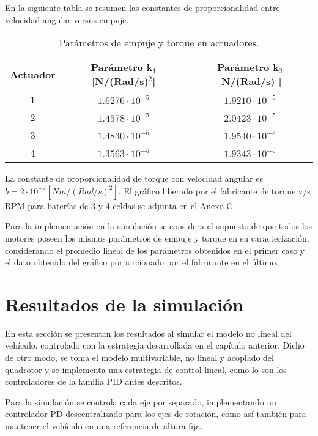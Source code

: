 \documentclass[../main.tex]{subfiles}
\begin{document}
\textcompwordmark{}

En la siguiente tabla se resumen las constantes de proporcionalidad
entre velocidad angular versus empuje. 

\begin{table}[H]
\noindent \begin{centering}
\begin{tabular}{|c|c|c|}
\hline 
Actuador & Parámetro k$_1$ {[}N/(Rad/s)$^{2}${]} & Parámetro k$_2$ {[}N/(Rad/s) {]}\tabularnewline
\hline 
\hline 
1 & $1.6276\cdot10^{-5}$ & $1.9210\cdot10^{-5}$\tabularnewline
\hline 
2 & $1.4578\cdot10^{-5}$ & $2.0423\cdot10^{-5}$\tabularnewline
\hline 
3 & $1.4830\cdot10^{-5}$ & $1.9540\cdot10^{-5}$\tabularnewline
\hline 
4 & $1.3563\cdot10^{-5}$ & $1.9343\cdot10^{-5}$\tabularnewline
\hline 
\end{tabular}
\par\end{centering}
\caption{Parámetros de empuje y torque en actuadores.}
\end{table}

La constante de proporcionalidad de torque con velocidad angular es
$b=2\cdot10^{-7}[Nm/(Rad/s)^{2}]$. El gráfico liberado por el fabricante de torque v/s RPM
para baterías de 3 y 4 celdas se adjunta en el Anexo C.

Para la implementación en la simulación se considera el supuesto de
que todos los motores poseen los mismos parámetros de empuje y torque
en su caracterización, considerando el promedio lineal de los parámetros
obtenidos en el primer caso y el dato obtenido del gráfico porporcionado
por el fabricante en el último.

\textcompwordmark{}

\section{Resultados de la simulación}

En esta sección se presentan los resultados al simular el modelo no lineal del vehículo, controlado con la estrategia desarrollada
en el capítulo anterior. Dicho de otro modo, se toma el modelo multivariable,
no lineal y acoplado del quadrotor y se implementa una estrategia
de control lineal, como lo son los controladores de la familia PID
antes descritos.

Para la simulación se controla cada eje por separado, implementando
un controlador PD descentralizado para los ejes de rotación, como
así también para mantener el vehículo en una referencia de altura
fija. 
\end{document}
